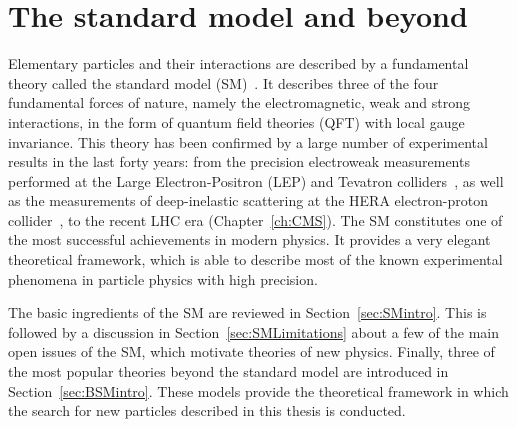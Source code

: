 \chapter{The standard model and beyond}
\label{ch:theory}

Elementary particles and their interactions are described by a fundamental theory called the standard model (SM)~\cite{QFTbook}.
It describes three of the four fundamental forces of nature, namely the electromagnetic, weak and strong interactions, in the form of quantum field theories (QFT) with local gauge invariance.
This theory has been confirmed by a large number of experimental results in the last forty years: from the precision electroweak measurements performed at the Large Electron-Positron (LEP) and Tevatron colliders~\cite{ALEPH:2010aa}, as well as the measurements of deep-inelastic scattering at the HERA electron-proton collider~\cite{Abramowicz:2015mha}, to the recent LHC era (Chapter~\ref{ch:CMS}).
The SM constitutes one of the most successful achievements in modern physics.
It provides a very elegant theoretical framework, which is able to describe most of the known experimental phenomena in particle physics with high precision.

The basic ingredients of the SM are reviewed in Section~\ref{sec:SMintro}. This is followed by a discussion in Section~\ref{sec:SMLimitations} about a few of the main open issues of the SM, which motivate theories of new physics.
Finally, three of the most popular theories beyond the standard model are introduced in Section~\ref{sec:BSMintro}. These models provide the theoretical framework in which the search for new particles described in this thesis is conducted.

  

  
  
  
  
